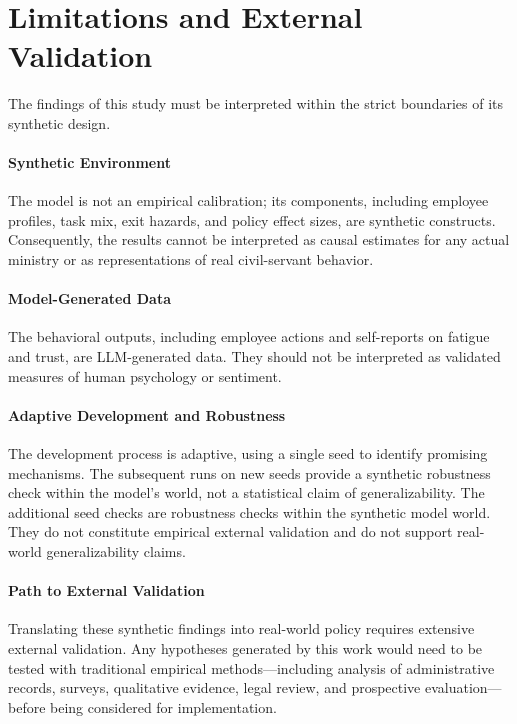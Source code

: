 \documentclass{article}
\begin{document}
\section{Limitations and External Validation}
The findings of this study must be interpreted within the strict boundaries of its synthetic design.

\paragraph{Synthetic Environment} The model is not an empirical calibration; its components, including employee profiles, task mix, exit hazards, and policy effect sizes, are synthetic constructs. Consequently, the results cannot be interpreted as causal estimates for any actual ministry or as representations of real civil-servant behavior.

\paragraph{Model-Generated Data} The behavioral outputs, including employee actions and self-reports on fatigue and trust, are LLM-generated data. They should not be interpreted as validated measures of human psychology or sentiment.

\paragraph{Adaptive Development and Robustness} The development process is adaptive, using a single seed to identify promising mechanisms. The subsequent runs on new seeds provide a synthetic robustness check within the model's world, not a statistical claim of generalizability. The additional seed checks are robustness checks within the synthetic model world. They do not constitute empirical external validation and do not support real-world generalizability claims.

\paragraph{Path to External Validation} Translating these synthetic findings into real-world policy requires extensive external validation. Any hypotheses generated by this work would need to be tested with traditional empirical methods---including analysis of administrative records, surveys, qualitative evidence, legal review, and prospective evaluation---before being considered for implementation.
\end{document}
